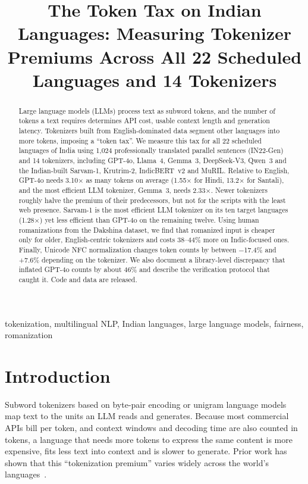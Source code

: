 \documentclass[conference]{IEEEtran}
\begin{document}
\title{The Token Tax on Indian Languages: Measuring Tokenizer Premiums Across All 22 Scheduled Languages and 14 Tokenizers}

\author{
}

\maketitle

\begin{abstract}
Large language models (LLMs) process text as subword tokens, and the number of tokens a text requires determines API cost, usable context length and generation latency. Tokenizers built from English-dominated data segment other languages into more tokens, imposing a ``token tax''. We measure this tax for all 22 scheduled languages of India using 1,024 professionally translated parallel sentences (IN22-Gen) and 14 tokenizers, including GPT-4o, Llama~4, Gemma~3, DeepSeek-V3, Qwen~3 and the Indian-built Sarvam-1, Krutrim-2, IndicBERT~v2 and MuRIL. Relative to English, GPT-4o needs 3.10$\times$ as many tokens on average (1.55$\times$ for Hindi, 13.2$\times$ for Santali), and the most efficient LLM tokenizer, Gemma~3, needs 2.33$\times$. Newer tokenizers roughly halve the premium of their predecessors, but not for the scripts with the least web presence. Sarvam-1 is the most efficient LLM tokenizer on its ten target languages (1.28$\times$) yet less efficient than GPT-4o on the remaining twelve. Using human romanizations from the Dakshina dataset, we find that romanized input is cheaper only for older, English-centric tokenizers and costs 38--44\% more on Indic-focused ones. Finally, Unicode NFC normalization changes token counts by between $-$17.4\% and +7.6\% depending on the tokenizer. We also document a library-level discrepancy that inflated GPT-4o counts by about 46\% and describe the verification protocol that caught it. Code and data are released.
\end{abstract}

\begin{IEEEkeywords}
tokenization, multilingual NLP, Indian languages, large language models, fairness, romanization
\end{IEEEkeywords}

\section{Introduction}
Subword tokenizers based on byte-pair encoding or unigram language models~\cite{sennrich2016,kudo2018} map text to the units an LLM reads and generates. Because most commercial APIs bill per token, and context windows and decoding time are also counted in tokens, a language that needs more tokens to express the same content is more expensive, fits less text into context and is slower to generate. Prior work has shown that this ``tokenization premium'' varies widely across the world's languages~\cite{petrov2023,ahia2023}.
\end{document}
